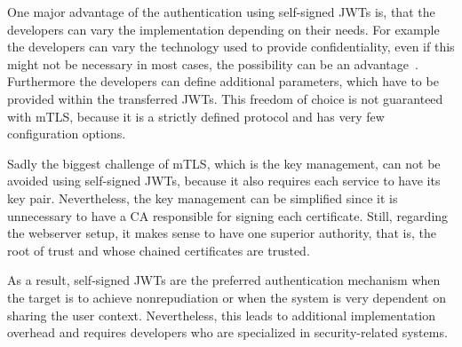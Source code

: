One major advantage of the authentication using self-signed JWTs is, that the developers can vary the implementation depending on their needs.
For example the developers can vary the technology used to provide confidentiality, even if this might not be necessary in most cases, the possibility can be an advantage~\cite{dias2020microservices}.
Furthermore the developers can define additional parameters, which have to be provided within the transferred JWTs.
This freedom of choice is not guaranteed with mTLS, because it is a strictly defined protocol and has very few configuration options.


Sadly the biggest challenge of mTLS, which is the key management, can not be avoided using self-signed JWTs, because it also requires each service to have its key pair.
Nevertheless, the key management can be simplified since it is unnecessary to have a CA responsible for signing each certificate.
Still, regarding the webserver setup, it makes sense to have one superior authority, that is, the root of trust and whose chained certificates are trusted.

As a result, self-signed JWTs are the preferred authentication mechanism when the target is to achieve nonrepudiation or when the system is very dependent on sharing the user context.
Nevertheless, this leads to additional implementation overhead and requires developers who are specialized in security-related systems.
